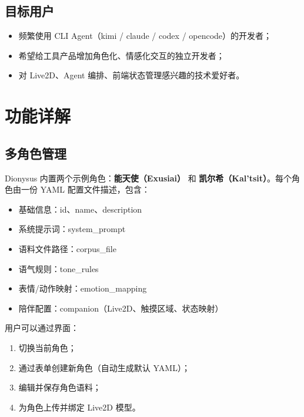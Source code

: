 \documentclass[12pt,a4paper]{article}
\begin{document}
\subsection{目标用户}

\begin{itemize}[leftmargin=2em]
  \item 频繁使用 CLI Agent（kimi / claude / codex / opencode）的开发者；
  \item 希望给工具产品增加角色化、情感化交互的独立开发者；
  \item 对 Live2D、Agent 编排、前端状态管理感兴趣的技术爱好者。
\end{itemize}

\section{功能详解}

\subsection{多角色管理}

Dionysus 内置两个示例角色：\textbf{能天使（Exusiai）} 和 \textbf{凯尔希（Kal'tsit）}。每个角色由一份 YAML 配置文件描述，包含：

\begin{itemize}[leftmargin=2em]
  \item 基础信息：id、name、description
  \item 系统提示词：system\_prompt
  \item 语料文件路径：corpus\_file
  \item 语气规则：tone\_rules
  \item 表情/动作映射：emotion\_mapping
  \item 陪伴配置：companion（Live2D、触摸区域、状态映射）
\end{itemize}

用户可以通过界面：

\begin{enumerate}[leftmargin=2em]
  \item 切换当前角色；
  \item 通过表单创建新角色（自动生成默认 YAML）；
  \item 编辑并保存角色语料；
  \item 为角色上传并绑定 Live2D 模型。
\end{enumerate}
\end{document}
